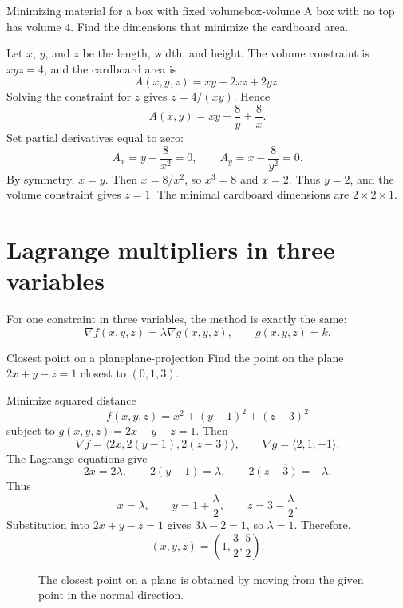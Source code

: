 \documentclass[11pt]{article}
\newcommand{\grad}{\nabla}
\begin{document}
\begin{workedexample}{Minimizing material for a box with fixed volume}{box-volume}
A box with no top has volume $4$. Find the dimensions that minimize the cardboard area.

Let $x$, $y$, and $z$ be the length, width, and height. The volume constraint is $xyz=4$, and the cardboard area is
\[
A(x,y,z)=xy+2xz+2yz.
\]
Solving the constraint for $z$ gives $z=4/(xy)$. Hence
\[
A(x,y)=xy+\frac8y+\frac8x.
\]
Set partial derivatives equal to zero:
\[
A_x=y-\frac8{x^2}=0,
\qquad
A_y=x-\frac8{y^2}=0.
\]
By symmetry, $x=y$. Then $x=8/x^2$, so $x^3=8$ and $x=2$. Thus $y=2$, and the volume constraint gives $z=1$. The minimal cardboard dimensions are $2\times2\times1$.
\end{workedexample}

\section{Lagrange multipliers in three variables}

For one constraint in three variables, the method is exactly the same:
\[
\grad f(x,y,z)=\lambda \grad g(x,y,z),
\qquad g(x,y,z)=k.
\]

\begin{workedexample}{Closest point on a plane}{plane-projection}
Find the point on the plane $2x+y-z=1$ closest to $(0,1,3)$.

Minimize squared distance
\[
f(x,y,z)=x^2+(y-1)^2+(z-3)^2
\]
subject to $g(x,y,z)=2x+y-z=1$. Then
\[
\grad f=\langle 2x,2(y-1),2(z-3)\rangle,
\qquad
\grad g=\langle 2,1,-1\rangle.
\]
The Lagrange equations give
\[
2x=2\lambda,
\qquad
2(y-1)=\lambda,
\qquad
2(z-3)=-\lambda.
\]
Thus
\[
x=\lambda,
\qquad
 y=1+\frac\lambda2,
\qquad
 z=3-\frac\lambda2.
\]
Substitution into $2x+y-z=1$ gives $3\lambda-2=1$, so $\lambda=1$. Therefore,
\[
(x,y,z)=\left(1,\frac32,\frac52\right).
\]
\end{workedexample}

\begin{figure}[H]
\centering
{}
\caption{The closest point on a plane is obtained by moving from the given point in the normal direction.}
\end{figure}
\end{document}
